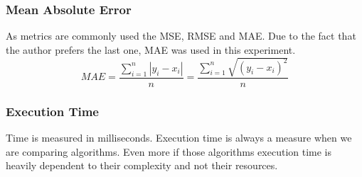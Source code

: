 \subsubsection{Mean Absolute Error}
As metrics are commonly used the MSE, RMSE and MAE. Due to the fact that the author prefers the last one, MAE was used in this experiment.
\begin{equation}
MAE = \frac{\sum_{i=1}^{n}{|y_{i}-x_{i}|} }{n} = \frac{\sum_{i=1}^{n}\sqrt{{(y_{i}-x_{i})}^{2}}}{n}
\end{equation}
\subsubsection{Execution Time}
Time is measured in milliseconds.
Execution time is always a measure when we are comparing algorithms. 
Even more if those algorithms execution time is heavily dependent to their complexity and not their resources.
